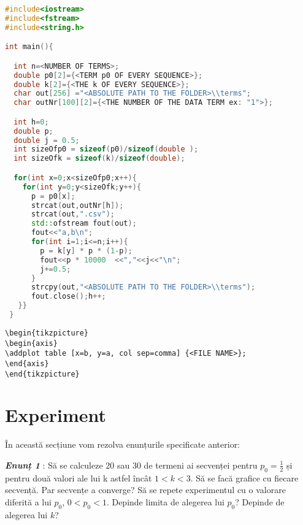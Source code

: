 \documentclass[a4paper,12pt]{article}
\begin{document}
\begin{lstlisting}[language=C++, caption=Program C++]
#include<iostream>
#include<fstream>
#include<string.h>

int main(){

  int n=<NUMBER OF TERMS>;
  double p0[2]={<TERM p0 OF EVERY SEQUENCE>};
  double k[2]={<THE k OF EVERY SEQUENCE>};
  char out[256] ="<ABSOLUTE PATH TO THE FOLDER>\\terms";
  char outNr[100][2]={<THE NUMBER OF THE DATA TERM ex: "1">};

  int h=0;
  double p;
  double j = 0.5;
  int sizeOfp0 = sizeof(p0)/sizeof(double );
  int sizeOfk = sizeof(k)/sizeof(double);

  for(int x=0;x<sizeOfp0;x++){
    for(int y=0;y<sizeOfk;y++){
      p = p0[x];
      strcat(out,outNr[h]);
      strcat(out,".csv");
      std::ofstream fout(out);
      fout<<"a,b\n";
      for(int i=1;i<=n;i++){
        p = k[y] * p * (1-p);
        fout<<p * 10000  <<","<<j<<"\n";
        j+=0.5;
      }
      strcpy(out,"<ABSOLUTE PATH TO THE FOLDER>\\terms");
      fout.close();h++;
   }}
 }

\end{lstlisting}

\begin{lstlisting}[caption = Bloc cod Latex]
\begin{tikzpicture}
\begin{axis}
\addplot table [x=b, y=a, col sep=comma] {<FILE NAME>};
\end{axis}
\end{tikzpicture}
\end{lstlisting}



\section{Experiment}
În această secțiune vom rezolva enunțurile specificate anterior:

\textit{\textbf{Enunț 1}} :  Să se calculeze 20 sau 30 de termeni ai secvenței pentru $p_0=\frac{1}{2}$ și pentru două valori ale lui k astfel încât $1<k<3$. Să se facă grafice cu fiecare secvență. Par secvențe a converge? Să se repete experimentul cu o valorare diferită a lui $p_0$, $0<p_0<1$. Depinde limita de alegerea lui $p_0$? Depinde de alegerea lui $k$?
\end{document}
